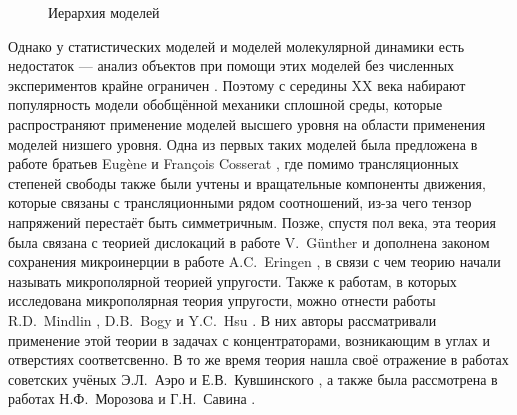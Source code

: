 \ifsynopsis
\else
\begin{figure}[ht]
    \caption{Иерархия моделей}\label{fig:ModelsHierarchy}
\end{figure}
\fi

\ifsynopsis
\else
Однако у статистических моделей и моделей молекулярной динамики есть недостаток --- анализ объектов при помощи этих моделей без численных экспериментов крайне ограничен \cite{MDExperiment}. Поэтому с середины XX века набирают популярность модели обобщённой механики сплошной среды, которые распространяют применение моделей высшего уровня на области применения моделей низшего уровня. Одна из первых таких моделей была предложена в работе братьев Eugène и François Cosserat \cite{Cosserat}, где помимо трансляционных степеней свободы также были учтены и вращательные компоненты движения, которые связаны с трансляционными рядом соотношений, из-за чего тензор напряжений перестаёт быть симметричным. Позже, спустя пол века, эта теория была связана с теорией дислокаций в работе V.~G{\"u}nther \cite{CosseratAndDislocation} и дополнена законом сохранения микроинерции в работе A.C.~Eringen \cite{Eringen2, Eringen3}, в связи с чем теорию начали называть микрополярной теорией упругости. Также к работам, в которых исследована микрополярная теория упругости, можно отнести работы R.D.~Mindlin \cite{Mindlin1, Mindlin2, Mindlin3}, D.B.~Bogy \cite{Bogy} и Y.C.~Hsu \cite{Hsu}. В них авторы рассматривали применение этой теории в задачах с концентраторами, возникающим в углах и отверстиях соответсвенно. В то же время теория нашла своё отражение в работах советских учёных Э.Л.~Аэро и Е.В.~Кувшинского \cite{Aero1,Aero2}, а также была рассмотрена в работах Н.Ф.~Морозова \cite{Morozov} и Г.Н.~Савина \cite{Savin}.
\fi

